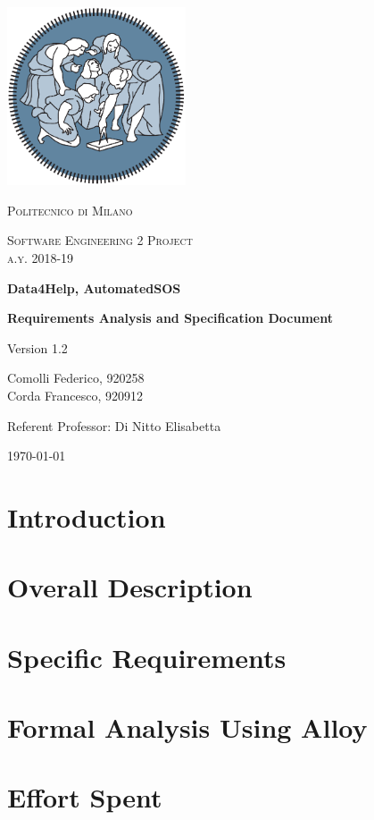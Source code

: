 \documentclass{report}
\author{Federico Comolli
        \and
        Francesco Corda}
\date{October 2018}
\begin{document}
\begin{titlepage}
	\centering
	\includegraphics[width=150pt]{images/polimi_logo}\par\vspace{1cm}
	{\scshape\LARGE
		Politecnico di Milano\par}
	\vspace{1cm}
	{\scshape\Large
		Software Engineering 2 Project\\
		a.y. 2018-19\par}
	\vspace{1.5cm}
	{\huge\bfseries
		Data4Help, AutomatedSOS\\\par}
	{\Large\bfseries
		Requirements Analysis and Specification Document\par}
	Version 1.2\par
	\vspace{2cm}
	{\Large
		Comolli Federico, 920258\\
	    Corda Francesco, 920912\par}
	\vfill
	Referent Professor: Di Nitto Elisabetta\par
	\vfill
	{\large\today\par}
\end{titlepage}


\renewcommand{\contentsname}{Table of Contents}
\tableofcontents


\chapter{Introduction}


\chapter{Overall Description}


\chapter{Specific Requirements}


\chapter{Formal Analysis Using Alloy}


\chapter{Effort Spent}
 



\end{document}
